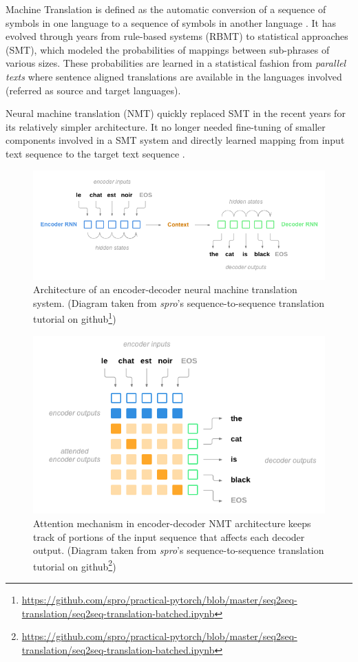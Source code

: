 Machine Translation is defined as the automatic conversion of a sequence of symbols in one language to a sequence of symbols in another language \citep{bengio_dl}. It has evolved through years from rule-based systems (RBMT) to statistical approaches (SMT), which modeled the probabilities of mappings between sub-phrases of various sizes. These probabilities are learned in a statistical fashion from \textit{parallel texts} where sentence aligned translations are available in the languages involved (referred as source and target languages). 

Neural machine translation (NMT) quickly replaced SMT in the recent years for its relatively simpler architecture. It no longer needed fine-tuning of smaller components involved in a SMT system and directly learned mapping from input text sequence to the target text sequence \citep{bahdanau, google_nmt}.

\begin{figure}[t]
  \centering
  \includegraphics[width=\linewidth]{img/spro_nmt.png}
  \caption{Architecture of an encoder-decoder neural machine translation system. (Diagram taken from \textit{spro}'s sequence-to-sequence translation tutorial on github\footnote{\url{https://github.com/spro/practical-pytorch/blob/master/seq2seq-translation/seq2seq-translation-batched.ipynb}})}
  \label{sota:nmt_schema}
\end{figure}

\begin{figure}[t]
  \centering
  \includegraphics[width=0.8\linewidth]{img/spro_nmt_attention.png}
  \caption{Attention mechanism in encoder-decoder NMT architecture keeps track of portions of the input sequence that affects each decoder output. (Diagram taken from \textit{spro}'s sequence-to-sequence translation tutorial on github\footnote{\url{https://github.com/spro/practical-pytorch/blob/master/seq2seq-translation/seq2seq-translation-batched.ipynb}})}
  \label{sota:nmt_attention}
\end{figure}

